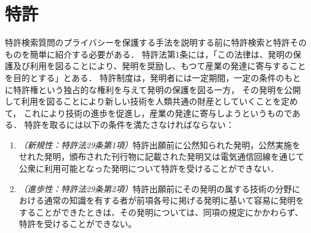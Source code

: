 \documentclass[master]{suribt}
\theoremstyle{definition}
\begin{document}
 \chapter{特許}
 特許検索質問のプライバシーを保護する手法を説明する前に特許検索と特許そのものを簡単に紹介する必要がある．
 特許法第1条には，「この法律は、発明の保護及び利用を図ることにより、発明を奨励し、もつて産業の発達に寄与することを目的とする」とある．
 特許制度は，発明者には一定期間，一定の条件のもとに特許権という独占的な権利を与えて発明の保護を図る一方，
 その発明を公開して利用を図ることにより新しい技術を人類共通の財産としていくことを定めて，
 これにより技術の進歩を促進し，産業の発達に寄与しようというものである．\cite{patent}
 特許を取るには以下の条件を満たさなければならない：
 \begin{enumerate}
 \item {\em （新規性：特許法29条第1項）}特許出願前に公然知られた発明，公然実施をせれた発明，頒布された刊行物に記載された発明又は電気通信回線を通じて公衆に利用可能となった発明について特許を受けることができない．
 \item {\em （進歩性：特許法29条第2項）}特許出願前にその発明の属する技術の分野における通常の知識を有する者が前項各号に掲げる発明に基いて容易に発明をすることができたときは、その発明については、同項の規定にかかわらず、特許を受けることができない。
 \end{enumerate}
\end{document}
